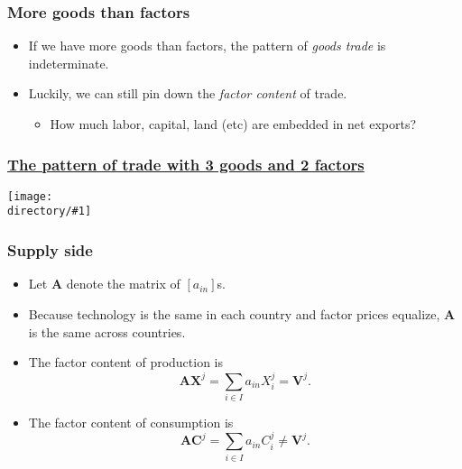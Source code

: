 \documentclass[compress,mathserif,aspectratio=169]{beamer}
\newcommand{\directory}{figures}
\newcommand{\widefigure}[2]{\begin{frame}\frametitle{\hyperlink{#1back}{#2}}\hypertarget{#1}{{\begin{center}\texttt{[image: \\directory/\#1]}\end{center}}}\end{frame}}
\begin{document}
\begin{frame}\frametitle{More goods than factors}\hypertarget{More goods than factors}{}
\begin{itemize}
\item If we have more goods than factors, the pattern of \emph{goods trade} is indeterminate.

\item Luckily, we can still pin down the \emph{factor content} of trade.
\begin{itemize}
\item How much labor, capital, land (etc) are embedded in net exports?


\end{itemize}

\end{itemize}
\end{frame}




\widefigure{HK1-4}{The pattern of trade with 3 goods and 2 factors}




\begin{frame}\frametitle{Supply side}\hypertarget{Supply side}{}
\begin{itemize}
\item Let $\mathbf A$ denote the matrix of $[a_{in}]$s.

\item Because technology is the same in each country and factor prices equalize, $\mathbf A$ is the same across countries.

\item The factor content of production is
\[
\mathbf A\mathbf X^j = \sum_{i\in I}a_{in}X_{i}^j = \mathbf V^j.
\]

\item The factor content of consumption is
\[
\mathbf A\mathbf C^j = \sum_{i\in I}a_{in}C_{i}^j \neq \mathbf V^j.
\]


\end{itemize}
\end{frame}
\end{document}
